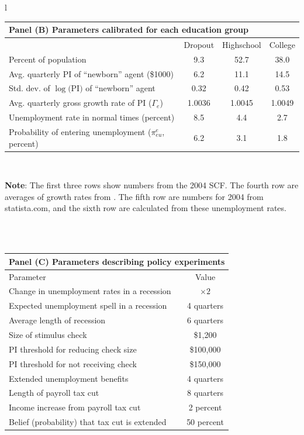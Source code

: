 \documentclass[\econtexRoot/HAFiscal]{subfiles}
\begin{document}
{\begin{table}[p]
\begin{center}
\begin{tabular}{l}
        \begin{tabular}{lccc}
          \toprule 
          \multicolumn{4}{l}{Panel (B) Parameters calibrated for each education group} \\ \midrule
          & Dropout & Highschool & College \\ \midrule
          Percent of population & \phantom{0}9.3 & 52.7 & 38.0 \\ 
          Avg. quarterly PI of ``newborn'' agent (\$1000) & \phantom{0}6.2 & 11.1 & 14.5 \\
          Std. dev. of $\log($PI$)$ of ``newborn'' agent & 0.32 & 0.42 & 0.53 \\
          Avg. quarterly gross growth rate of PI ($\Gamma_e$) & 1.0036 & 1.0045 & 1.0049 \\
          Unemployment rate in normal times (percent) & \phantom{0}8.5 & \phantom{0}4.4 & \phantom{0}2.7 \\ 
          Probability of entering unemployment ($\pi_{eu}^{e}$, percent) & \phantom{0}6.2 & \phantom{0}3.1 & \phantom{0}1.8 
          \\ \bottomrule 
        \end{tabular} \\
        \parbox{16cm}{\small \vspace{.25cm} \textbf{Note}: The first three rows show numbers from the 2004 SCF. The fourth row are averages of growth rates from \cite{carroll2020modeling}. The fifth row are numbers for 2004 from statista.com, and the sixth row are calculated from these unemployment rates.\normalsize}
        \\ \\

        \begin{tabular}{lc}
          \toprule 
          \multicolumn{2}{l}{Panel (C) Parameters describing policy experiments} \\ \midrule 
          Parameter & Value \\ \midrule 
          Change in unemployment rates in a recession & $\times 2$ \\ 
          Expected unemployment spell in a recession & 4 quarters \\ 
          Average length of recession & 6 quarters \\ 
          Size of stimulus check & \$1,200 \\ 
          PI threshold for reducing check size & \$100,000 \\ 
          PI threshold for not receiving check & \$150,000 \\ 
          Extended unemployment benefits & 4 quarters \\
          Length of payroll tax cut & 8 quarters \\ 
          Income increase from payroll tax cut & 2 percent \\ 
          Belief (probability) that tax cut is extended & 50 percent 		
          \\ \bottomrule
        \end{tabular} 


\end{tabular}
\end{center}
\end{table}}
\end{document}
